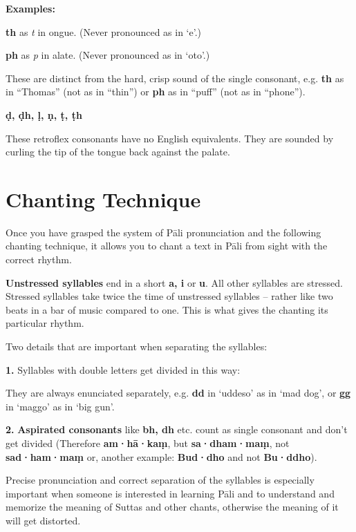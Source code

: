 \textbf{Examples:}

\textbf{th} as \emph{t} in ongue. (Never pronounced as in `e'.)

\textbf{ph} as \emph{p} in alate. (Never pronounced as in `oto'.)

These are distinct from the hard, crisp sound of the single consonant,
e.g. \textbf{th} as in “Thomas” (not as in “thin”) or \textbf{ph} as in
“puff” (not as in “phone”).

\textbf{ḍ, ḍh, ḷ, ṇ, ṭ, ṭh}

These retroflex consonants have no English equivalents. They are sounded
by curling the tip of the tongue back against the palate.

\section{Chanting Technique}

Once you have grasped the system of Pāli pronunciation and the following
chanting technique, it allows you to chant a text in Pāli from sight
with the correct rhythm.

\textbf{Unstressed syllables} end in a short \textbf{a, i} or
\textbf{u}. All other syllables are stressed. Stressed syllables take
twice the time of unstressed syllables – rather like two beats in a bar
of music compared to one. This is what gives the chanting its particular
rhythm.


Two details that are important when separating the syllables:

\textbf{1.} Syllables with double letters get divided in this way:


They are always enunciated separately, e.g. \textbf{dd} in ‘uddeso’ as
in ‘mad dog’, or \textbf{gg} in ‘maggo’ as in ‘big gun’.

\textbf{2.} \textbf{Aspirated consonants} like \textbf{bh, dh} etc.
count as single consonant and don't get divided (Therefore
\textbf{am·hā·kaṃ}, but \textbf{sa·dham·maṃ}, not \textbf{sad·ham·maṃ}
or, another example: \textbf{Bud·dho} and not \textbf{Bu·ddho}).

Precise pronunciation and correct separation of the syllables is
especially important when someone is interested in learning Pāli and to
understand and memorize the meaning of Suttas and other chants,
otherwise the meaning of it will get distorted.

